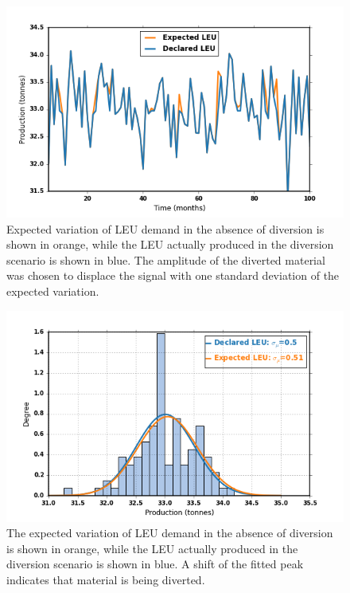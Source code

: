 \begin{figure}
\begin{center}
\includegraphics[natwidth=162bp,natheight=227bp, scale=0.7]{./figs/nat_delta_R5.png}
\end{center}
\caption{Expected variation of \gls{LEU} demand in the absence of diversion is shown in orange, while the \gls{LEU} actually produced in the diversion scenario is shown in blue. The amplitude of the diverted material was chosen to displace the signal with one standard deviation of the expected variation.}
\label{fig:leu_produced}
\end{figure}


\begin{figure}
\begin{center}
\includegraphics[natwidth=162bp,natheight=227bp, scale=0.7]{./figs/netLEU_hist_R5_new.png}
\end{center}
\caption{The expected variation of \gls{LEU} demand in the absence of diversion is shown in orange, while the \gls{LEU} actually produced in the diversion scenario is shown in blue.  A shift of the fitted peak indicates that material is being diverted.}
\label{fig:leu_histogram}
\end{figure}

